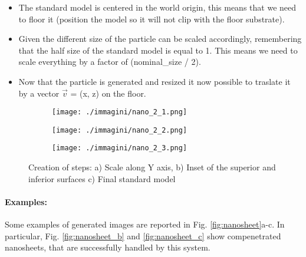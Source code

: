 \begin{itemize}
    \item The standard model is centered in the world origin, this means that we need to floor it (position the model so it will not clip with the floor substrate).
    \item Given the different size of the particle can be scaled accordingly, remembering that the half size of the standard model is equal to 1. This means we need to scale everything by a factor of (nominal\_size / 2).
    \item Now that the particle is generated and resized it now possible to traslate it by a vector $\vec{v}$ = (x, z) on the floor.
\end{itemize}

\begin{figure}[ht]
    \centering
    \begin{subfigure}[b]{0.3\textwidth}
        \texttt{[image: ./immagini/nano\_2\_1.png]}
        \caption{}
        \label{fig:nano_pos_a}
    \end{subfigure}
    \hfill
    \begin{subfigure}[b]{0.3\textwidth}
        \texttt{[image: ./immagini/nano\_2\_2.png]}
        \caption{}
        \label{fig:nano_pos_b}
    \end{subfigure}
    \hfill
    \begin{subfigure}[b]{0.3\textwidth}
        \texttt{[image: ./immagini/nano\_2\_3.png]}
        \caption{}
        \label{fig:nano_pos_c}
    \end{subfigure}
    \caption{Creation of steps: a) Scale along Y axis, b) Inset of the superior and inferior surfaces c) Final standard model}
    \label{fig:nano_pos}
\end{figure}

\newpage

\paragraph{Examples: }

Some examples of generated images are reported in Fig. \ref{fig:nanosheet}a-c. In particular, Fig. \ref{fig:nanosheet_b} and \ref{fig:nanosheet_c} show compenetrated nanosheets, that are successfully handled by this system.

